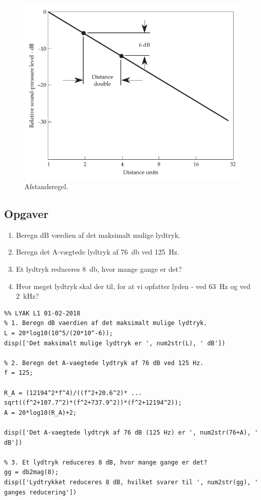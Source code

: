 \begin{figure} [H]
	\centering
	\includegraphics[width=0.85\linewidth]{graphics/10.png}
	\caption{Afstandsregel.}
	\label{fig:10}
\end{figure}

\newpage
\subsection{Opgaver}

\begin{enumerate}
	\item Beregn dB værdien af det maksimalt mulige lydtryk.
	\item Beregn det A-vægtede lydtryk af \SI{76}{\decibel} ved \SI{125}{\hertz}.
	\item Et lydtryk reduceres \SI{8}{\decibel}, hvor mange gange er det?
	\item Hvor meget lydtryk skal der til, for at vi opfatter lyden - ved \SI{63}{\hertz} og ved \SI{2}{\kilo\hertz}?
\end{enumerate}


\begin{lstlisting}
%% LYAK L1 01-02-2018
% 1. Beregn dB vaerdien af det maksimalt mulige lydtryk.
L = 20*log10(10^5/(20*10^-6));
disp(['Det maksimalt mulige lydtryk er ', num2str(L), ' dB']) 

% 2. Beregn det A-vaegtede lydtryk af 76 dB ved 125 Hz.
f = 125;

R_A = (12194^2*f^4)/((f^2+20.6^2)* ...
sqrt((f^2+107.7^2)*(f^2+737.9^2))*(f^2+12194^2));
A = 20*log10(R_A)+2;

disp(['Det A-vaegtede lydtryk af 76 dB (125 Hz) er ', num2str(76+A), ' dB']) 

% 3. Et lydtryk reduceres 8 dB, hvor mange gange er det?
gg = db2mag(8);
disp(['Lydtrykket reduceres 8 dB, hvilket svarer til ', num2str(gg), ' ganges reducering'])
\end{lstlisting}

